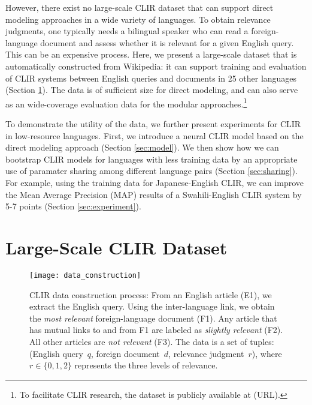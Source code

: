 \documentclass[11pt,a4paper]{article}
\begin{document}
However, there exist no large-scale CLIR dataset that can support direct modeling approaches in a wide variety of languages.
To obtain relevance judgments, one typically needs a bilingual speaker who can read a foreign-language document and assess whether it is relevant for a given English query. 
This can be an expensive process.
Here, we present a large-scale dataset that is automatically constructed from Wikipedia: 
it can support training and evaluation of CLIR systems between English queries and documents in 25 other languages (Section \ref{sec:dataset}).
The data is of sufficient size for direct modeling, and can also serve as an wide-coverage evaluation data for the modular approaches.\footnote{To facilitate CLIR research, the dataset is publicly available at (URL).}

To demonstrate the utility of the data, we further present experiments for CLIR in low-resource languages. 
First, we introduce a neural CLIR model based on the direct modeling approach (Section \ref{sec:model}). 
We then show how we can bootstrap CLIR models for languages with less training data by an appropriate use of paramater sharing among different language pairs (Section \ref{sec:sharing}). 
For example, using the training data for Japanese-English CLIR, we can improve the Mean Average Precision (MAP) results of a Swahili-English CLIR system by 5-7 points (Section \ref{sec:experiment}). 



\section{Large-Scale CLIR Dataset}
\label{sec:dataset}

\begin{figure}[t]
	\centering
	\texttt{[image: data\_construction]}
	\caption{\label{fig:data_construction} CLIR data construction process: From an English article (E1), we extract the English query. Using the inter-language link, we obtain the \textit{most relevant} foreign-language document (F1). Any article that has mutual links to and from F1 are labeled as \textit{slightly relevant} (F2). All other articles are \textit{not relevant} (F3). The data is a set of tuples: (English query~$q$, foreign document~$d$, relevance judgment~$r$), where $r\in{\{0,1,2\}}$ represents the three levels of relevance.}
\end{figure}
\end{document}
